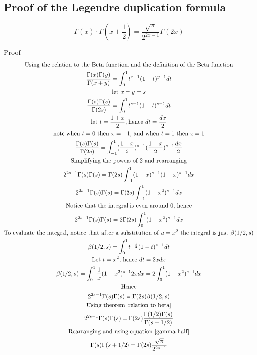 \documentclass[a4paper]{article}
\begin{document}
\subsection{Proof of the Legendre duplication formula} \label{proof of leg dup}

\begin{theorem}
\begin{equation}
\boxed{
\Gamma(x) \cdot \Gamma(x+\frac{1}{2}) = \frac{\sqrt{\pi}}{2^{2x - 1}} \Gamma(2x)
}
\end{equation}

Proof
\\
\begin{gather*}
\text{Using the relation to the Beta function, and the definition of the Beta function}
\\
\frac{\Gamma(x) \Gamma(y)}{\Gamma(x+y)} =
\int_{0}^{1} t^{x-1} (1-t)^{y-1} dt
\\
\text{let $x=y=s$}
\\
\frac{\Gamma(s) \Gamma(s)}{\Gamma(2s)} =
\int_{0}^{1} t^{s-1} (1-t)^{s-1} dt
\\
\text{let $t = \frac{1+x}{2}$, hence $dt = \frac{dx}{2}$}
\\
\text{note when $t=0$ then $x=-1$, and when $t=1$ then $x=1$}
\\
\frac{\Gamma(s) \Gamma(s)}{\Gamma(2s)} =
\int_{-1}^{1} (\frac{1+x}{2})^{s-1} (\frac{1-x}{2})^{s-1} \frac{dx}{2}
\\
\text{Simplifying the powers of 2 and rearranging}
\\
2^{2s -1} \Gamma(s) \Gamma(s)= \Gamma(2s)
\int_{-1}^{1} (1+x)^{s-1} (1-x)^{s-1} dx
\\
2^{2s -1} \Gamma(s) \Gamma(s)= 
\Gamma(2s) \int_{-1}^{1} (1-x^2)^{s-1} dx
\\
\text{Notice that the integral is even around 0, hence}
\\
2^{2s -1} \Gamma(s) \Gamma(s)= 
2 \Gamma(2s) \int_{0}^{1} (1-x^2)^{s-1} dx
\\
\text{To evaluate the integral, notice that after a substitution of $u=x^2$ the integral is just $\beta(1/2, s)$}
\\
\beta(1/2, s) = \int_{0}^{1} t^{-\frac{1}{2}} (1-t)^{s-1} dt
\\
\text{Let $t=x^2$, hence $dt = 2x dx$}
\\
\beta(1/2, s) 
=
\int_{0}^{1} \frac{1}{x}(1-x^2)^{s-1} 2x dx 
=
2\int_{0}^{1} (1-x^2)^{s-1} dx 
\\
\text{Hence}
\\
2^{2s -1} \Gamma(s) \Gamma(s)= \Gamma(2s) \beta(1/2, s) 
\\
\text{Using theorem \ref{relation to beta}}
\\
2^{2s -1} \Gamma(s) \Gamma(s)= \Gamma(2s) \frac{\Gamma(1/2) \Gamma(s)}{\Gamma(s+1/2)} 
\\
\text{Rearranging and using equation \ref{gamma half}}
\\
 \Gamma(s) \Gamma(s+1/2)= \Gamma(2s) \frac{\sqrt{\pi}}{2^{2s -1}} 
\end{gather*}
\end{theorem}
\end{document}
